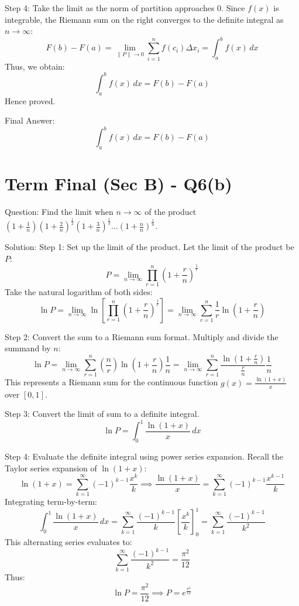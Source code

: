 \documentclass{article}
\begin{document}
Step 4: Take the limit as the norm of partition approaches 0.
Since $f(x)$ is integrable, the Riemann sum on the right converges to the definite integral as $n \to \infty$:
\[
F(b) - F(a) = \lim_{\|P\| \to 0} \sum_{i=1}^n f(c_i) \Delta x_i = \int_a^b f(x) \, dx
\]
Thus, we obtain:
\[
\int_a^b f(x) \, dx = F(b) - F(a)
\]
Hence proved.

Final Answer:
\[
\boxed{\int_a^b f(x) \, dx = F(b) - F(a)}
\]

\section*{Term Final (Sec B) - Q6(b)}
Question:
Find the limit when $n \to \infty$ of the product $\left(1 + \frac{1}{n}\right)\left(1 + \frac{2}{n}\right)^{\frac{1}{2}}\left(1 + \frac{3}{n}\right)^{\frac{1}{3}} \dots \left(1 + \frac{n}{n}\right)^{\frac{1}{n}}$.

Solution:
Step 1: Set up the limit of the product.
Let the limit of the product be $P$:
\[
P = \lim_{n \to \infty} \prod_{r=1}^n \left(1 + \frac{r}{n}\right)^{\frac{1}{r}}
\]
Take the natural logarithm of both sides:
\[
\ln P = \lim_{n \to \infty} \ln \left[ \prod_{r=1}^n \left(1 + \frac{r}{n}\right)^{\frac{1}{r}} \right] = \lim_{n \to \infty} \sum_{r=1}^n \frac{1}{r} \ln \left(1 + \frac{r}{n}\right)
\]

Step 2: Convert the sum to a Riemann sum format.
Multiply and divide the summand by $n$:
\[
\ln P = \lim_{n \to \infty} \sum_{r=1}^n \left( \frac{n}{r} \right) \ln \left(1 + \frac{r}{n}\right) \frac{1}{n} = \lim_{n \to \infty} \sum_{r=1}^n \frac{\ln\left(1 + \frac{r}{n}\right)}{\frac{r}{n}} \frac{1}{n}
\]
This represents a Riemann sum for the continuous function $g(x) = \frac{\ln(1+x)}{x}$ over $[0, 1]$.

Step 3: Convert the limit of sum to a definite integral.
\[
\ln P = \int_0^1 \frac{\ln(1+x)}{x} \, dx
\]

Step 4: Evaluate the definite integral using power series expansion.
Recall the Taylor series expansion of $\ln(1+x)$:
\[
\ln(1+x) = \sum_{k=1}^\infty (-1)^{k-1} \frac{x^k}{k} \implies \frac{\ln(1+x)}{x} = \sum_{k=1}^\infty (-1)^{k-1} \frac{x^{k-1}}{k}
\]
Integrating term-by-term:
\[
\int_0^1 \frac{\ln(1+x)}{x} \, dx = \sum_{k=1}^\infty \frac{(-1)^{k-1}}{k} \left[ \frac{x^k}{k} \right]_0^1 = \sum_{k=1}^\infty \frac{(-1)^{k-1}}{k^2}
\]
This alternating series evaluates to:
\[
\sum_{k=1}^\infty \frac{(-1)^{k-1}}{k^2} = \frac{\pi^2}{12}
\]
Thus:
\[
\ln P = \frac{\pi^2}{12} \implies P = e^{\frac{\pi^2}{12}}
\]
\end{document}
